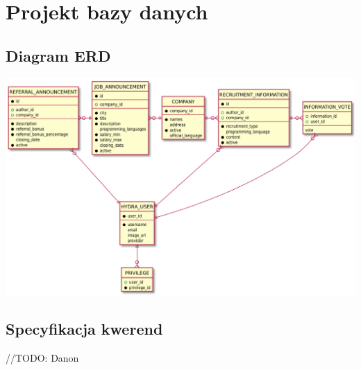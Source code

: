 \documentclass[oneside]{scrreprt}
\begin{document}
\chapter{Projekt bazy danych}

\section{Diagram ERD}
\includegraphics[width=\textwidth, keepaspectratio]{graphics/hydra_db_erd.pdf}

\section{Specyfikacja kwerend}
//TODO: Danon
\end{document}
